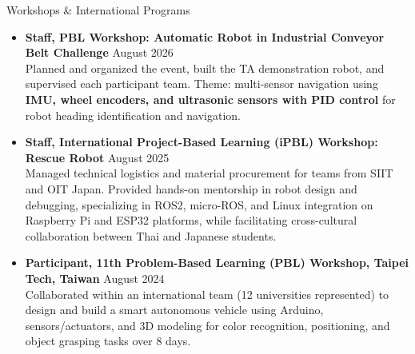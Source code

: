 \documentclass[11pt]{resume} %
\begin{document}
\begin{rSection}{Workshops \& International Programs}
    \begin{itemize}
        \item \textbf{Staff, PBL Workshop: Automatic Robot in Industrial Conveyor Belt Challenge} \hfill { August 2026 }
        \\ Planned and organized the event, built the TA demonstration robot, and supervised each participant team. Theme: multi-sensor navigation using \textbf{IMU, wheel encoders, and ultrasonic sensors with PID control} for robot heading identification and navigation.
        \item \textbf{Staff, International Project-Based Learning (iPBL) Workshop: Rescue Robot} \hfill { August 2025 }
        \\ Managed technical logistics and material procurement for teams from SIIT and OIT Japan. Provided hands-on mentorship in robot design and debugging, specializing in ROS2, micro-ROS, and Linux integration on Raspberry Pi and ESP32 platforms, while facilitating cross-cultural collaboration between Thai and Japanese students.
        \item \textbf{Participant, 11th Problem-Based Learning (PBL) Workshop, Taipei Tech, Taiwan} \hfill { August 2024 }
        \\ Collaborated within an international team (12 universities represented) to design and build a smart autonomous vehicle using Arduino, sensors/actuators, and 3D modeling for color recognition, positioning, and object grasping tasks over 8 days.
    \end{itemize}
\end{rSection}
\end{document}
